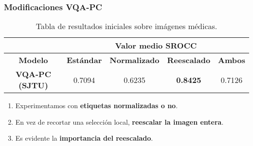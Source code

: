 \begin{frame}
  \frametitle{Modificaciones VQA-PC}
\begin{table}[htp]
  \small
  \centering
\begin{tabular}{|c|cccc|}
\hline
\rowcolor[HTML]{FFC702}
                       & \multicolumn{4}{c|}{\textbf{Valor medio SROCC}}                                                                                                    \\ \hline
\rowcolor[HTML]{FFC702}
\textbf{Modelo}        & \multicolumn{1}{c|}{\textbf{Estándar}} & \multicolumn{1}{c|}{\textbf{Normalizado}} & \multicolumn{1}{c|}{\textbf{Reescalado}} & \textbf{Ambos}  \\ \hline
\textbf{VQA-PC (SJTU)} & \multicolumn{1}{c|}{0.7094}            & \multicolumn{1}{c|}{0.6235}      & \multicolumn{1}{c|}{\textbf{0.8425}}    & 0.7126          \\ \hline
\end{tabular}
\caption[Valor medio sobre imágenes médicas.]{Tabla de resultados iniciales sobre imágenes médicas.}
\label{tab:SroccMedRes}
\begin{enumerate}
    \item Experimentamos con \textbf{etiquetas normalizadas o no}.
    \item En vez de recortar una selección local, \textbf{reescalar la imagen entera}.
    \item Es evidente la \textbf{importancia del reescalado}.
  \end{enumerate}
\end{table}
\end{frame}

